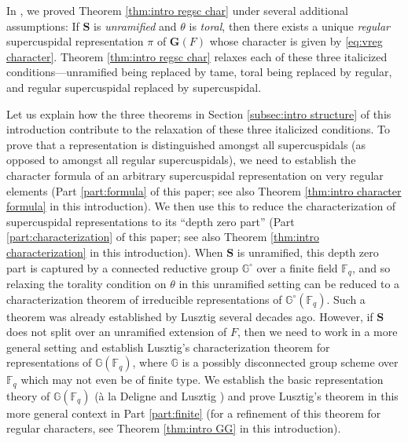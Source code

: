 \documentclass{amsart}
\newcommand{\F}{\mathbb{F}}
\newcommand{\FF}{\mathbb{F}}
\newcommand{\bbG}{\mathbb{G}}
\newcommand{\bfG}{\mathbf{G}}
\newcommand{\bfS}{\mathbf{S}}
\theoremstyle{plain}
\theoremstyle{definition}
\theoremstyle{remark}
\theoremstyle{theorem}
\begin{document}
In \cite[Section 9]{CO21}, we proved Theorem \ref{thm:intro regsc char} under several additional assumptions: If $\bfS$ is \textit{unramified} and $\theta$ is \textit{toral}, then there exists a unique \textit{regular} supercuspidal representation $\pi$ of $\bfG(F)$ whose character is given by \eqref{eq:vreg character}. Theorem \ref{thm:intro regsc char} relaxes each of these three italicized conditions---unramified being replaced by tame, toral being replaced by regular, and regular supercuspidal replaced by supercuspidal. 

Let us explain how the three theorems in Section \ref{subsec:intro structure} of this introduction contribute to the relaxation of these three italicized conditions. 
To prove that a representation is distinguished amongst all supercuspidals (as opposed to amongst all regular supercuspidals), we need to establish the character formula of an arbitrary supercuspidal representation on very regular elements (Part \ref{part:formula} of this paper; see also Theorem \ref{thm:intro character formula} in this introduction).
We then use this to reduce the characterization of supercuspidal representations to its ``depth zero part'' (Part \ref{part:characterization} of this paper; see also Theorem \ref{thm:intro characterization} in this introduction). When $\bfS$ is unramified, this depth zero part is captured by a connected reductive group $\bbG^\circ$ over a finite field $\F_{q}$, and so relaxing the torality condition on $\theta$ in this unramified setting can be reduced to a characterization theorem of irreducible representations of $\bbG^\circ(\FF_q)$. Such a theorem was already established by Lusztig \cite{Lus20} several decades ago. However, if $\bfS$ does not split over an unramified extension of $F$, then we need to work in a more general setting and establish Lusztig's characterization theorem for representations of $\bbG(\FF_q)$, where $\bbG$ is a possibly disconnected group scheme over $\F_{q}$ which may not even be of finite type. We establish the basic representation theory of $\bbG(\FF_q)$ (\`a la Deligne and Lusztig \cite{DL76}) and prove Lusztig's theorem in this more general context in Part \ref{part:finite} (for a refinement of this theorem for regular characters, see Theorem \ref{thm:intro GG} in this introduction).
\end{document}

